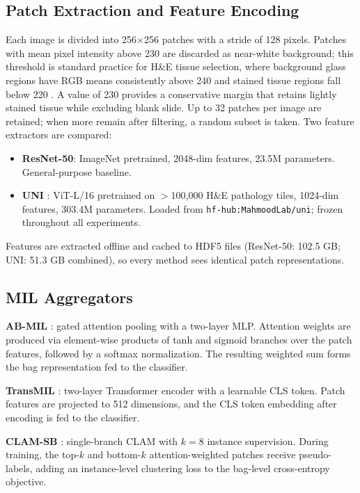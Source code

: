 \documentclass[conference]{IEEEtran}
\begin{document}
\subsection{Patch Extraction and Feature Encoding}

Each image is divided into 256$\times$256 patches with a stride of 128 pixels. Patches with mean pixel intensity above 230 are discarded as near-white background; this threshold is standard practice for H\&E tissue selection, where background glass regions have RGB means consistently above 240 and stained tissue regions fall below 220 \cite{lu2021data}. A value of 230 provides a conservative margin that retains lightly stained tissue while excluding blank slide. Up to 32 patches per image are retained; when more remain after filtering, a random subset is taken. Two feature extractors are compared:

\begin{itemize}
    \item \textbf{ResNet-50}: ImageNet pretrained, 2048-dim features, 23.5M parameters. General-purpose baseline.
    \item \textbf{UNI} \cite{chen2024uni}: ViT-L/16 pretrained on $>$100,000 H\&E pathology tiles, 1024-dim features, 303.4M parameters. Loaded from \texttt{hf-hub:MahmoodLab/uni}; frozen throughout all experiments.
\end{itemize}

Features are extracted offline and cached to HDF5 files (ResNet-50: 102.5 GB; UNI: 51.3 GB combined), so every method sees identical patch representations.

\subsection{MIL Aggregators}

\textbf{AB-MIL} \cite{ilse2018attention}: gated attention pooling with a two-layer MLP. Attention weights are produced via element-wise products of tanh and sigmoid branches over the patch features, followed by a softmax normalization. The resulting weighted sum forms the bag representation fed to the classifier.

\textbf{TransMIL} \cite{shao2021transmil}: two-layer Transformer encoder with a learnable CLS token. Patch features are projected to 512 dimensions, and the CLS token embedding after encoding is fed to the classifier.

\textbf{CLAM-SB} \cite{lu2021data}: single-branch CLAM with $k=8$ instance supervision. During training, the top-$k$ and bottom-$k$ attention-weighted patches receive pseudo-labels, adding an instance-level clustering loss to the bag-level cross-entropy objective.
\end{document}
